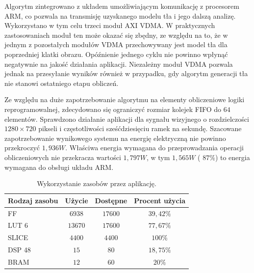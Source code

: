 Algorytm zintegrowano z układem umożliwiającym komunikację z procesorem ARM, co pozwala na transmisję uzyskanego modelu tła i jego dalszą analizę. 
Wykorzystano w tym celu trzeci moduł AXI VDMA.
W praktycznych zastosowaniach moduł ten może okazać się zbędny, ze względu na to, że w jednym z pozostałych modułów VDMA przechowywany jest model tła dla poprzedniej klatki obrazu. 
Opóźnienie jednego cyklu nie powinno wpłynąć negatywnie na jakość działania aplikacji. 
Niezależny moduł VDMA pozwala jednak na przesyłanie wyników również w przypadku, gdy algorytm generacji tła nie stanowi ostatniego etapu obliczeń.


Ze względu na duże zapotrzebowanie algorytmu na elementy obliczeniowe logiki reprogramowalnej, zdecydowano się ograniczyć rozmiar kolejek FIFO do $64$ elementów.
Sprawdzono działanie aplikacji dla sygnału wizyjnego o rozdzielczości $1280 \times 720$ pikseli i częstotliwości sześćdziesięciu ramek na sekundę.
Szacowane zapotrzebowanie wynikowego systemu na energię elektryczną nie powinno przekroczyć $1,936W$. Właściwa energia wymagana do przeprowadzania operacji obliczeniowych nie przekracza wartości $1,797W$, w tym $1,565W$ ( $87\%$) to energia wymagana do obsługi układu ARM.


\begin{table}[!htb]
	\caption{Wykorzystanie zasobów przez aplikację.}
	\centering
	\label{tab;background-model-utilization}
	\begin{tabular}{|l|c|c|c|}
		\hline
		\textbf{Rodzaj zasobu} & \textbf{Użycie} & \textbf{Dostępne} & \textbf{Procent użycia}      \\ \hline
		FF                     & $6938$            & $17600$             & $39,42\%$                 \\ \hline
		LUT 6                  & $13670$            & $17600$             & $77,67\%$                 \\ \hline
		SLICE                  & $4400$            & $4400$             & $100\%$                 \\ \hline
		DSP 48                 & $15$               & $80$                & $18,75\%$                    \\ \hline
		BRAM                   & $12$               & $60$                & $20\%$                   \\ \hline
	\end{tabular}
\end{table}


